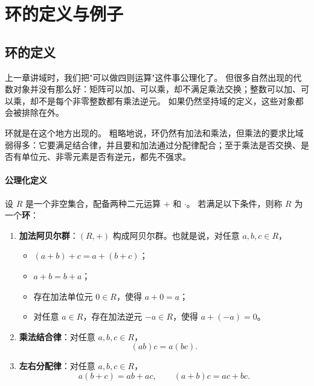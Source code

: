 
\section{环的定义与例子}\label{sec:ring-definition-examples}

\subsection{环的定义}\label{sec:ring-definition}

上一章讲域时，我们把"可以做四则运算"这件事公理化了。
但很多自然出现的代数对象并没有那么好：矩阵可以加、可以乘，却不满足乘法交换；整数可以加、可以乘，却不是每个非零整数都有乘法逆元。
如果仍然坚持域的定义，这些对象都会被排除在外。

环就是在这个地方出现的。
粗略地说，环仍然有加法和乘法，但乘法的要求比域弱得多：它要满足结合律，并且要和加法通过分配律配合；至于乘法是否交换、是否有单位元、非零元素是否有逆元，都先不强求。

\paragraph*{公理化定义}

\begin{definition}[环]\label{def:ring}
设 $R$ 是一个非空集合，配备两种二元运算 $+$ 和 $\cdot$。
若满足以下条件，则称 $R$ 为一个\textbf{环}：

\begin{enumerate}
    \item \textbf{加法阿贝尔群}：$(R,+)$ 构成阿贝尔群。也就是说，对任意 $a,b,c\in R$，
    \begin{itemize}
        \item $(a+b)+c=a+(b+c)$；
        \item $a+b=b+a$；
        \item 存在加法单位元 $0\in R$，使得 $a+0=a$；
        \item 对任意 $a\in R$，存在加法逆元 $-a\in R$，使得 $a+(-a)=0$。
    \end{itemize}
    \item \textbf{乘法结合律}：对任意 $a,b,c\in R$，
    \[
    (ab)c=a(bc).
    \]
    \item \textbf{左右分配律}：对任意 $a,b,c\in R$，
    \[
    a(b+c)=ab+ac,\qquad (a+b)c=ac+bc.
    \]
\end{enumerate}
\end{definition}

